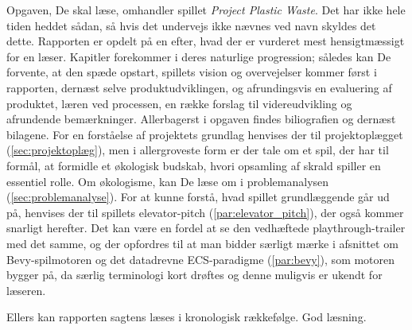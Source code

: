 Opgaven, De skal læse, omhandler spillet \textit{Project Plastic Waste}. Det har ikke hele tiden heddet sådan, så hvis det undervejs ikke nævnes ved navn skyldes det dette. Rapporten er opdelt på en efter, hvad der er vurderet mest hensigtmæssigt for en læser. Kapitler forekommer i deres naturlige progression; således kan De forvente, at den spæde opstart, spillets vision og overvejelser kommer først i rapporten, dernæst selve produktudviklingen, og afrundingsvis en evaluering af produktet, læren ved processen, en række forslag til videreudvikling og afrundende bemærkninger. Allerbagerst i opgaven findes biliografien og dernæst bilagene. For en forståelse af projektets grundlag henvises der til projektoplægget (\autoref{sec:projektoplæg}), men i allergroveste form er der tale om et spil, der har til formål, at formidle et økologisk budskab, hvori opsamling af skrald spiller en essentiel rolle. Om økologisme, kan De læse om i problemanalysen (\autoref{sec:problemanalyse}). For at kunne forstå, hvad spillet grundlæggende går ud på, henvises der til spillets elevator-pitch (\autoref{par:elevator_pitch}), der også kommer snarligt herefter. Det kan være en fordel at se den vedhæftede playthrough-trailer med det samme, og der opfordres til at man bidder særligt mærke i afsnittet om Bevy-spilmotoren og det datadrevne ECS-paradigme (\autoref{par:bevy}), som motoren bygger på, da særlig terminologi kort drøftes og denne muligvis er ukendt for læseren.

Ellers kan rapporten sagtens læses i kronologisk rækkefølge. God læsning.
